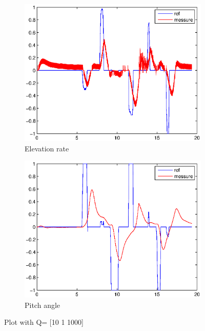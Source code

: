 \begin{figure}[H]
\graphicspath{ {Part3_pictures/}}
\begin{subfigure}{0.5\textwidth}
    \includegraphics[width=0.9\linewidth]{Part3_pictures/p3p2/Q2elevation.eps} 
    \caption{Elevation rate}
    \label{p3p2Q2e}
\end{subfigure}
\begin{subfigure}{0.5\textwidth}
    \includegraphics[width=0.9\linewidth]{Part3_pictures/p3p2/Q2pitch.eps}
    \caption{Pitch angle}
    \label{p3p2Q2p}
\end{subfigure}
\caption{Plot with Q= [10 1 1000]}
\label{p3p2Q2}
\end{figure}

